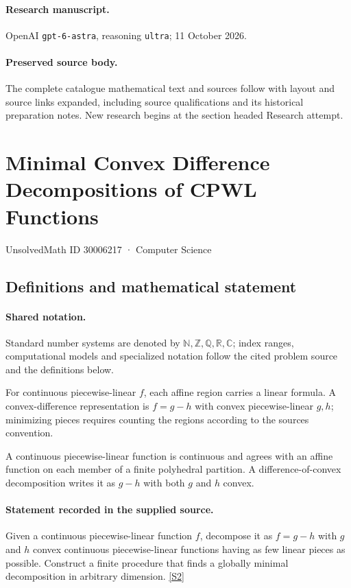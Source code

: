 \documentclass[11pt]{article}
\begin{document}
\paragraph{Research manuscript.} OpenAI \texttt{gpt-6-astra}, reasoning \texttt{ultra}; 11 October 2026.
\paragraph{Preserved source body.} The complete catalogue mathematical text and sources follow with layout and source links expanded, including source qualifications and its historical preparation notes. New research begins at the section headed Research attempt.

\section{Minimal Convex Difference Decompositions of CPWL Functions}\label{30006217}
{\small UnsolvedMath ID 30006217 · Computer Science}
\subsection{Definitions and mathematical statement}

\paragraph{Shared notation.}Standard number systems are denoted by $\mathbb N,\mathbb Z,\mathbb Q,\mathbb R,\mathbb C$; index ranges, computational models and specialized notation follow the cited problem source and the definitions below.


For continuous piecewise-linear $f$, each affine region carries a linear formula. A convex-difference representation is $f=g-h$ with convex piecewise-linear $g,h$; minimizing pieces requires counting the regions according to the source\textquotesingle s convention.

A continuous piecewise-linear function is continuous and agrees with an affine function on each member of a finite polyhedral partition. A difference-of-convex decomposition writes it as $g-h$ with both $g$ and $h$ convex.
\paragraph{Statement recorded in the supplied source.}
Given a continuous piecewise-linear function $f$, decompose it as $f=g-h$ with $g$ and $h$ convex continuous piecewise-linear functions having as few linear pieces as possible. Construct a finite procedure that finds a globally minimal decomposition in arbitrary dimension. \href{https://doi.org/10.4171/owr/2025/12}{[S2]}
\end{document}
